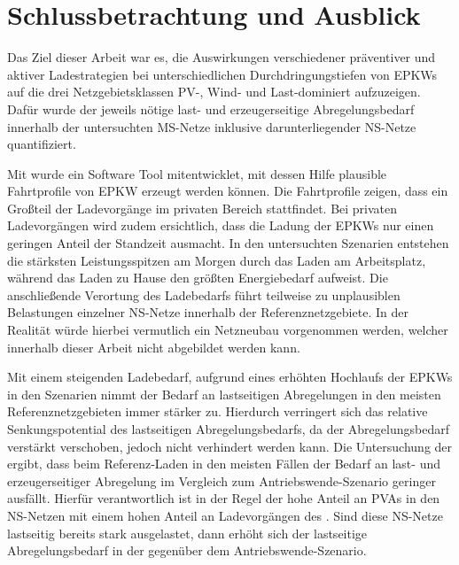 \section{Schlussbetrachtung und Ausblick}\label{chap:schlussbetrachtung}

Das Ziel dieser Arbeit war es, die Auswirkungen verschiedener präventiver und aktiver Ladestrategien bei unterschiedlichen Durchdringungstiefen von \glspl{EPKW} auf die drei Netzgebietsklassen \gls{PV}-, Wind- und Last-dominiert aufzuzeigen.
Dafür wurde der jeweils nötige last- und erzeugerseitige Abregelungsbedarf innerhalb der untersuchten \gls{MS}-Netze inklusive darunterliegender \gls{NS}-Netze quantifiziert.\medskip

Mit  wurde ein Software Tool mitentwicklet, mit dessen Hilfe plausible Fahrtprofile von \gls{EPKW} erzeugt werden können.
Die Fahrtprofile zeigen, dass ein Großteil der Ladevorgänge im privaten Bereich stattfindet.
Bei privaten Ladevorgängen wird zudem ersichtlich, dass die Ladung der \glspl{EPKW} nur einen geringen Anteil der Standzeit ausmacht.
In den untersuchten Szenarien entstehen die stärksten Leistungsspitzen am Morgen durch das Laden am Arbeitsplatz, während das Laden zu Hause den größten Energiebedarf aufweist.
Die anschließende Verortung des Ladebedarfs führt teilweise zu unplausiblen Belastungen einzelner \gls{NS}-Netze innerhalb der Referenznetzgebiete.
In der Realität würde hierbei vermutlich ein Netzneubau vorgenommen werden, welcher innerhalb dieser Arbeit nicht abgebildet werden kann.\medskip

Mit einem steigenden Ladebedarf, aufgrund eines erhöhten Hochlaufs der \glspl{EPKW} in den Szenarien nimmt der Bedarf an lastseitigen Abregelungen in den meisten Referenznetzgebieten immer stärker zu.
Hierdurch verringert sich das relative Senkungspotential des lastseitigen Abregelungsbedarfs, da der Abregelungsbedarf verstärkt verschoben, jedoch nicht verhindert werden kann.
Die Untersuchung der \SzeFirmenparkplatz ergibt, dass beim Referenz-Laden in den meisten Fällen der Bedarf an last- und erzeugerseitiger Abregelung im Vergleich zum Antriebswende-Szenario geringer ausfällt.
Hierfür verantwortlich ist in der Regel der hohe Anteil an \glspl{PVA} in den \gls{NS}-Netzen mit einem hohen Anteil an Ladevorgängen des \UC \zHdot.
Sind diese \gls{NS}-Netze lastseitig bereits stark ausgelastet, dann erhöht sich der lastseitige Abregelungsbedarf in der \SzeFirmenparkplatz gegenüber dem Antriebswende-Szenario.\medskip

